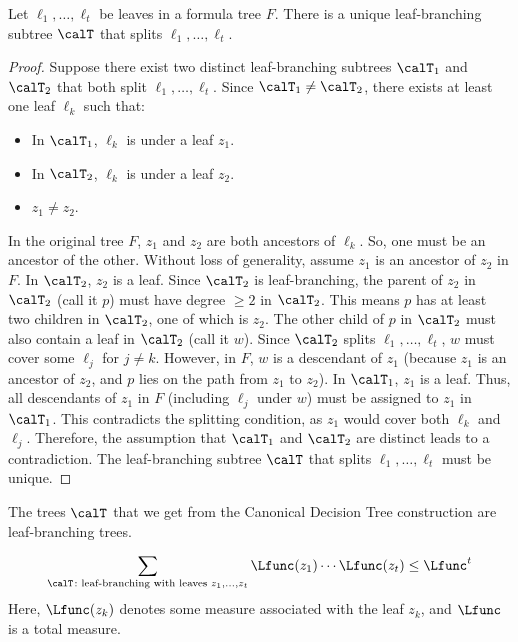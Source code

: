 \begin{claim}
    Let $\ell_1, \dots , \ell_t$ be leaves in a formula tree $F$. There is a unique leaf-branching subtree $\calT$ that splits $\ell_1, \dots , \ell_t$.
\end{claim}
\begin{proof}
    Suppose there exist two distinct leaf-branching subtrees $\calT_1$ and $\calT_2$ that both split $\ell_1, \dots , \ell_t$.
    Since $\calT_1 \neq \calT_2$, there exists at least one leaf $\ell_k$ such that:
    \begin{itemize}
        \item In $\calT_1$, $\ell_k$ is under a leaf $z_1$.
        \item In $\calT_2$, $\ell_k$ is under a leaf $z_2$.
        \item $z_1 \neq z_2$.
    \end{itemize}
    In the original tree $F$, $z_1$ and $z_2$ are both ancestors of $\ell_k$. So, one must be an ancestor of the other. Without loss of generality, assume $z_1$ is an ancestor of $z_2$ in $F$.
    In $\calT_2$, $z_2$ is a leaf. Since $\calT_2$ is leaf-branching, the parent of $z_2$ in $\calT_2$ (call it $p$) must have degree $\ge 2$ in $\calT_2$. This means $p$ has at least two children in $\calT_2$, one of which is $z_2$.
    The other child of $p$ in $\calT_2$ must also contain a leaf in $\calT_2$ (call it $w$). Since $\calT_2$ splits $\ell_1, \dots ,\ell_t$, $w$ must cover some $\ell_j$ for $j \neq k$. However, in $F$, $w$ is a descendant of $z_1$ (because $z_1$ is an ancestor of $z_2$, and $p$ lies on the path from $z_1$ to $z_2$).
    In $\calT_1$, $z_1$ is a leaf. Thus, all descendants of $z_1$ in $F$ (including $\ell_j$ under $w$) must be assigned to $z_1$ in $\calT_1$. This contradicts the splitting condition, as $z_1$ would cover both $\ell_k$ and $\ell_j$.
    Therefore, the assumption that $\calT_1$ and $\calT_2$ are distinct leads to a contradiction. The leaf-branching subtree $\calT$ that splits $\ell_1, \dots , \ell_t$ must be unique.
\end{proof}

\begin{claim}
    The trees $\calT$ that we get from the Canonical Decision Tree construction are leaf-branching trees.
\end{claim}

\begin{claim}
    \[
    \sum_{\calT \colon \text{leaf-branching with leaves } z_1,\dots , z_t} \Lfunc(z_1) \cdots \Lfunc(z_t) \leq \Lfunc^t
    \]
    Here, $\Lfunc(z_k)$ denotes some measure associated with the leaf $z_k$, and $\Lfunc$ is a total measure.
\end{claim}
